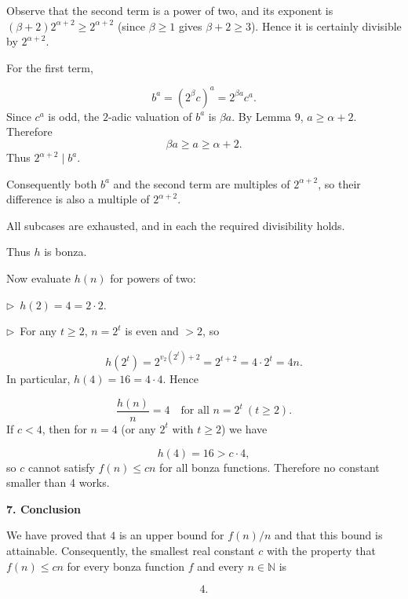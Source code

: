 \documentclass{llmxive}
\providecommand{\solutionheading}[1]{\par\smallskip\noindent\textbf{#1}\par}
\providecommand{\compactbullet}[1]{\par\noindent$\triangleright$~#1\par}
\begin{document}
Observe that the second term is a power of two, and its exponent is \((\beta+2)2^{\alpha+2} \ge 2^{\alpha+2}\) (since \(\beta\ge1\) gives \(\beta+2\ge3\)). Hence it is certainly divisible by \(2^{\alpha+2}\).\par
For the first term,\par
\[
b^{a} = (2^{\beta}c)^{a} = 2^{\beta a} c^{a}.
\]
Since \(c^{a}\) is odd, the \(2\)-adic valuation of \(b^{a}\) is \(\beta a\). By Lemma 9, \(a \ge \alpha+2\). Therefore
\[
    \beta a \ge a \ge \alpha+2.
    \]
Thus \(2^{\alpha+2} \mid b^{a}\).\par
Consequently both \(b^{a}\) and the second term are multiples of \(2^{\alpha+2}\), so their difference is also a multiple of \(2^{\alpha+2}\).\par
All subcases are exhausted, and in each the required divisibility holds.\par
\smallskip
Thus \(h\) is bonza.\par
Now evaluate \(h(n)\) for powers of two:\par
\compactbullet{\(h(2)=4 = 2\cdot2\).}
\compactbullet{For any \(t\ge2\), \(n=2^{t}\) is even and \(>2\), so}
\[
h(2^{t}) = 2^{v_{2}(2^{t})+2} = 2^{t+2} = 4\cdot 2^{t} = 4n.
\]
In particular, \(h(4)=16 = 4\cdot4\). Hence\par
\[
\frac{h(n)}{n} = 4 \quad\text{for all } n=2^{t}\ (t\ge2).
\]
If \(c<4\), then for \(n=4\) (or any \(2^{t}\) with \(t\ge2\)) we have\par
\[
h(4) = 16 > c\cdot 4,
\]
so \(c\) cannot satisfy \(f(n)\le cn\) for all bonza functions. Therefore no constant smaller than 4 works.\par
\smallskip
\solutionheading{7. Conclusion}
We have proved that \(4\) is an upper bound for \(f(n)/n\) and that this bound is attainable. Consequently, the smallest real constant \(c\) with the property that \(f(n)\le cn\) for every bonza function \(f\) and every \(n\in\mathbb N\) is\par
\[
\boxed{4}.
\]
\par
\end{document}
